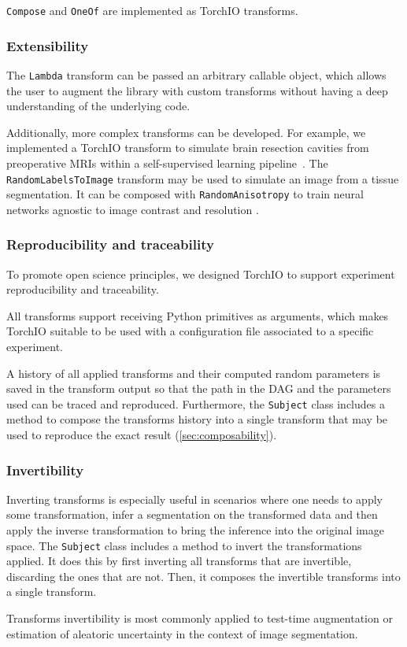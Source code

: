 \texttt{Compose} and \texttt{OneOf} are implemented as TorchIO
transforms.


\subsubsection{Extensibility}

The \texttt{Lambda} transform can be passed an arbitrary callable object, which allows the user to augment the library with custom transforms without having a deep understanding of the underlying code.

Additionally, more complex transforms can be developed.
For example, we implemented a TorchIO transform to simulate brain resection cavities from preoperative \acp{MRI} within a self-supervised learning pipeline~\cite{perez-garcia_simulation_2020}.
The \texttt{RandomLabelsToImage} transform may be used to simulate an image from a tissue segmentation.
It can be composed with \texttt{RandomAnisotropy} to train neural networks agnostic to image contrast and resolution \cite{billot_learning_2020, billot_partial_2020,iglesias_joint_2020}.


\subsubsection{Reproducibility and traceability}

To promote open science principles, we designed TorchIO to support experiment reproducibility and traceability.

All transforms support receiving Python primitives as arguments, which makes TorchIO suitable to be used with a configuration file associated to a specific experiment.

A history of all applied transforms and their computed random parameters is saved in the transform output so that the path in the \ac{DAG} and the parameters used can be traced and reproduced.
Furthermore, the \texttt{Subject} class includes a method to compose the transforms history into a single transform that may be used to reproduce the exact result (\cref{sec:composability}).


\subsubsection{Invertibility}

Inverting transforms is especially useful in scenarios where one needs to apply some transformation, infer a segmentation on the transformed data and then apply the inverse transformation to bring the inference into the original image space.
The \texttt{Subject} class includes a method to invert the transformations applied.
It does this by first inverting all transforms that are invertible, discarding the ones that are not.
Then, it composes the invertible transforms into a single transform.

Transforms invertibility is most commonly applied to test-time augmentation \cite{moshkov_test-time_2020} or estimation of aleatoric uncertainty \cite{wang_aleatoric_2019} in the context of image segmentation.

